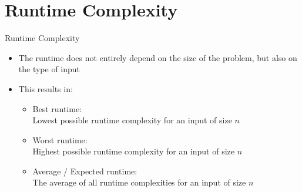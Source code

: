 \section{Runtime Complexity}

\begin{frame}{Runtime Complexity}
  \begin{itemize}
    \item
      The runtime does not entirely depend on the size of the problem, but also
      on the type of input
    \item
      This results in:
    \begin{itemize}
      \item
        {\color{Mittel-Blau}Best runtime:}\\
        Lowest possible runtime complexity for an input of size $n$
      \item
        {\color{Mittel-Blau}Worst runtime:}\\
        Highest possible runtime complexity for an input of size $n$
      \item
        {\color{Mittel-Blau}Average / Expected runtime:}\\
        The average of all runtime complexities for an input of size $n$
    \end{itemize}
  \end{itemize}
\end{frame}


